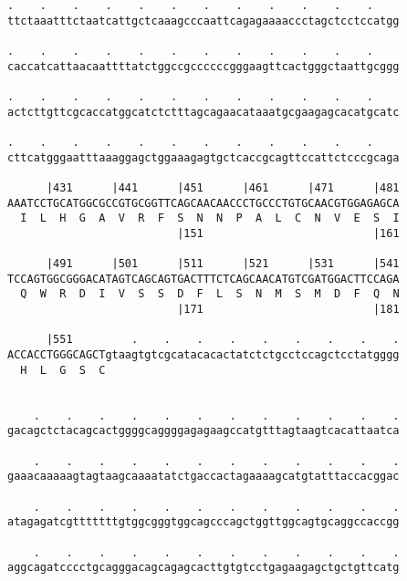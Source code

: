 \documentclass{article}
\begin{document}
\begin{Verbatim}
.    .    .    .    .    .    .    .    .    .    .    .    
ttctaaatttctaatcattgctcaaagcccaattcagagaaaaccctagctcctccatgg
                                                            
.    .    .    .    .    .    .    .    .    .    .    .    
caccatcattaacaattttatctggccgccccccgggaagttcactgggctaattgcggg
                                                            
.    .    .    .    .    .    .    .    .    .    .    .    
actcttgttcgcaccatggcatctctttagcagaacataaatgcgaagagcacatgcatc
                                                            
.    .    .    .    .    .    .    .    .    .    .    .    
cttcatgggaatttaaaggagctggaaagagtgctcaccgcagttccattctcccgcaga
                                                            
      |431      |441      |451      |461      |471      |481
AAATCCTGCATGGCGCCGTGCGGTTCAGCAACAACCCTGCCCTGTGCAACGTGGAGAGCA
  I  L  H  G  A  V  R  F  S  N  N  P  A  L  C  N  V  E  S  I
                          |151                          |161
  
      |491      |501      |511      |521      |531      |541
TCCAGTGGCGGGACATAGTCAGCAGTGACTTTCTCAGCAACATGTCGATGGACTTCCAGA
  Q  W  R  D  I  V  S  S  D  F  L  S  N  M  S  M  D  F  Q  N
                          |171                          |181
  
      |551         .    .    .    .    .    .    .    .    .
ACCACCTGGGCAGCTgtaagtgtcgcatacacactatctctgcctccagctcctatgggg
  H  L  G  S  C                                             
                                                            
  
    .    .    .    .    .    .    .    .    .    .    .    .
gacagctctacagcactggggcaggggagagaagccatgtttagtaagtcacattaatca
                                                            
    .    .    .    .    .    .    .    .    .    .    .    .
gaaacaaaaagtagtaagcaaaatatctgaccactagaaaagcatgtatttaccacggac
                                                            
    .    .    .    .    .    .    .    .    .    .    .    .
atagagatcgtttttttgtggcgggtggcagcccagctggttggcagtgcaggccaccgg
                                                            
    .    .    .    .    .    .    .    .    .    .    .    .
aggcagatcccctgcagggacagcagagcacttgtgtcctgagaagagctgctgttcatg
                                                            

\end{Verbatim}
\end{document}
